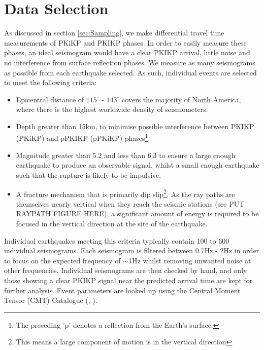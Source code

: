\documentclass[11pt,a4paper]{article}
\begin{document}
\section{Data Selection}
\label{sec:Data}
As discussed in section \ref{sec:Sampling}, we make differential travel time measurements of PKiKP and PKIKP phases. In order to easily measure these phases, an ideal seismogram would have a clear PKIKP arrival, little noise and no interference from surface reflection phases. We measure as many seismograms as possible from each earthquake selected. As such, individual events are selected to meet the following criteria:

\begin{itemize}
	\item Epicentral distance of $115^{\circ}$ - $143^{\circ}$ covers the majority of North America, where there is the highest worldwide density of seismometers.
	\item  Depth greater than 15km, to minimise possible interference between PKIKP (PKiKP) and pPKIKP (pPKiKP) phases\footnote{The preceding 'p' denotes a reflection from the Earth's surface.}.
	\item Magnitude greater than 5.2 and less than 6.3 to ensure a large enough earthquake to produce an observable signal, whilst a small enough earthquake such that the rupture is likely to be impulsive.
	\item A fracture mechanism that is primarily dip slip\footnote{This means a large component of motion is in the vertical direction}. As the ray paths are themselves nearly vertical when they reach the seismic stations (see PUT RAYPATH FIGURE HERE), a significant amount of energy is required to be focused in the vertical direction at the site of the earthquake.
\end{itemize}

Individual earthquakes meeting this criteria typically contain 100 to 600 individual seismograms. Each seismogram is filtered between 0.7Hz - 2Hz in order to focus on the expected frequency of $\sim$1Hz whilst removing unwanted noise at other frequencies. Individual seismograms are then checked by hand, and only those showing a clear PKIKP signal near the predicted arrival time are kept for further analysis. Event parameters are looked up using the Central Moment Tensor (CMT) Catalogue (\cite{Dziewonski1981}, \cite{Ekstrom2012}).

\end{document}
